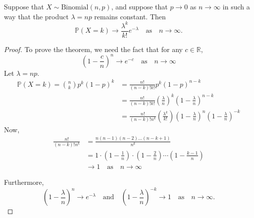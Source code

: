 \documentclass[lecture]{csm}
\newcommand{\prob}{\mathbb{P}}
\newcommand{\R}{\mathbb{R}}
\begin{document}
\begin{theorem}
Suppose that $X\sim\text{Binomial}(n,p)$, and suppose that $p\to 0$ as $n\to\infty$ in such a way that the product $\lambda=np$ remains constant. Then 
\[
\prob(X=k)\to \frac{\lambda^k}{k!}e^{-\lambda} \quad\text{as}\quad n\to\infty.
\]
\end{theorem}

\begin{proof}
To prove the theorem, we need the fact that for any $c\in\R$,
\[
\left(1-\frac{c}{n}\right)^n \to e^{-c}\quad\text{as}\quad n\to\infty
\]
Let $\lambda=np$.
\begin{align*}
\prob(X=k) = \binom{n}{k}p^k(1-p)^k 
	& = \frac{n!}{(n-k)!k!} p^k (1-p)^{n-k} \\
	& = \frac{n!}{(n-k)!k!} \left(\frac{\lambda}{n}\right)^k \left(1-\frac{\lambda}{n}\right)^{n-k} \\
	& =  \frac{n!}{(n-k)!n^k}\left(\frac{\lambda^k}{k!}\right) \left(1-\frac{\lambda}{n}\right)^n \left(1-\frac{\lambda}{n}\right)^{-k}
\end{align*}
Now,
\begin{align*}
\frac{n!}{(n-k)!n^k} 
	& = \frac{n(n-1)(n-2)\ldots(n-k+1)}{n^k} \\
	& = 1\cdot\left(1-\frac{1}{n}\right)\cdot\left(1-\frac{2}{n}\right)\cdots\left(1-\frac{k-1}{n}\right) \\
	& \to 1 \quad\text{as}\quad n\to\infty 
\end{align*}
\newpage


Furthermore,
\[
\left(1-\frac{\lambda}{n}\right)^n \to e^{-\lambda} \quad\text{and}\quad \left(1-\frac{\lambda}{n}\right)^{-k} \to 1 \quad\text{as}\quad n\to\infty.
\]


\end{proof}
\end{document}
